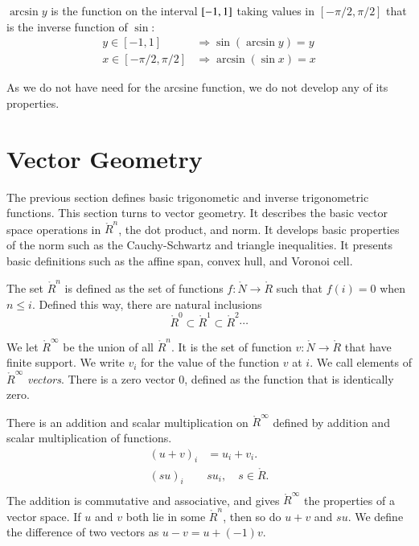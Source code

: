 \begin{definition}[arcsine]\label{def:arcsin}
$\arcsin y$ is the function on the interval $[
-1,1]$ taking values in $[-\pi/2,\pi/2]$ that is the
inverse function of $\sin$:
    $$\begin{array}{lll}
        y\in [-1,1] &\Rightarrow \sin(\arcsin y) = y\\
        x\in[-\pi/2,\pi/2] &\Rightarrow \arcsin(\sin x) = x
    \end{array}$$
\end{definition}

As we do not have need for the arcsine function, we do not develop
any of its properties.





\section{Vector Geometry}

The previous section defines basic trigonometic and
inverse trigonometric functions.  This section turns
to vector geometry.  It describes the basic vector
space operations in $\ring{R}^n$, the dot product, and
norm.  It develops basic properties of the norm such
as the Cauchy-Schwartz and triangle inequalities.
It presents basic definitions such as the affine span,
convex hull, and Voronoi cell.


The set $\ring{R}^n$ is defined as the set of functions
$f:\ring{N}\to\ring{R}$ such that $f(i) = 0$ when $n\le i$. Defined
this way, there are natural inclusions
    $$\ring{R}^0 \subset \ring{R}^1 \subset \ring{R}^2 \cdots$$

We let $\ring{R}^\infty$ be the union of all $\ring{R}^n$.  It is
the set of function $v:\ring{N}\to\ring{R}$ that have finite
support.  We write $v_i$ for the value of the function $v$ at $i$.
We call elements of $\ring{R}^\infty$ {\it vectors}.  There is a
zero vector $0$, defined as the function that is identically zero.

There is an addition and scalar multiplication on $\ring{R}^\infty$
defined by addition and scalar multiplication of functions.
    $$\begin{array}{lll}
    (u + v)_i &= u_i + v_i.\\
    (s u)_i & s u_i,\quad s\in\ring{R}.\\
    \end{array}
    $$
The addition is commutative and associative, and gives
$\ring{R}^\infty$ the properties of a vector space. If $u$ and
$v$ both lie in some $\ring{R}^n$, then so do $u+v$ and $s u$.
We define the difference of two vectors as $u - v = u + (-1) v$.

